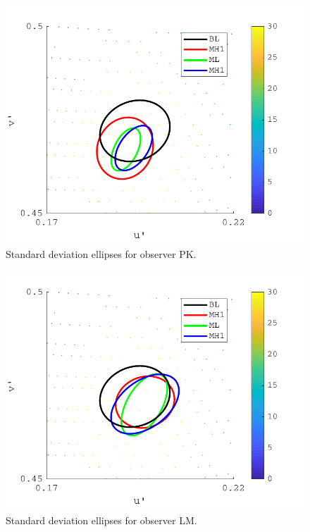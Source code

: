 \begin{figure}[hbtp]
\includegraphics[max width=\textwidth]{figs/tablet/PAMELA_20180205_Individual.pdf} 
\caption{Standard deviation ellipses for observer PK.}
\label{fig:PAMELA_20180205_Individual}
\end{figure}

\begin{figure}[hbtp]
\includegraphics[max width=\textwidth]{figs/tablet/PAMELA_20180205_Individual2.pdf} 
\caption{Standard deviation ellipses for observer LM.}
\label{fig:PAMELA_20180205_Individual2}
\end{figure}

